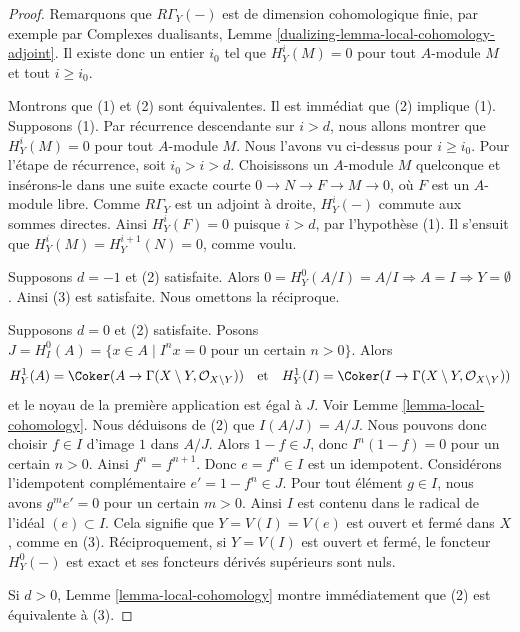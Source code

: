 \begin{proof}
Remarquons que $R\Gamma_Y(-)$ est de dimension cohomologique finie, par exemple par
Complexes dualisants, Lemme \ref{dualizing-lemma-local-cohomology-adjoint}.
Il existe donc un entier $i_0$ tel que
$H^i_Y(M) = 0$ pour tout $A$-module $M$ et tout $i \geq i_0$.

\medskip\noindent
Montrons que (1) et (2) sont équivalentes. Il est immédiat que
(2) implique (1). Supposons (1). Par récurrence descendante sur $i > d$,
nous allons montrer que $H^i_Y(M) = 0$ pour tout $A$-module $M$.
Nous l'avons vu ci-dessus pour $i \geq i_0$. Pour l'étape de récurrence,
soit $i_0 > i > d$. Choisissons un $A$-module $M$ quelconque et insérons-le dans
une suite exacte courte $0 \to N \to F \to M \to 0$, où $F$ est un
$A$-module libre. Comme $R\Gamma_Y$ est un adjoint à droite,
$H^i_Y(-)$ commute aux sommes directes. Ainsi $H^i_Y(F) = 0$
puisque $i > d$, par l'hypothèse (1). Il s'ensuit que
$H^i_Y(M) = H^{i + 1}_Y(N) = 0$, comme voulu.

\medskip\noindent
Supposons $d = -1$ et (2) satisfaite. Alors $0 = H^0_Y(A/I) = A/I \Rightarrow A = I
\Rightarrow Y = \emptyset$. Ainsi (3) est satisfaite. Nous omettons la réciproque.

\medskip\noindent
Supposons $d = 0$ et (2) satisfaite. Posons
$J = H^0_I(A) = \{x \in A \mid I^nx = 0 \text{ pour un certain }n > 0\}$.
Alors
$$
H^1_Y(A) = \Coker(A \to \Gamma(X \setminus Y, \mathcal{O}_{X \setminus Y}))
\quad\text{et}\quad
H^1_Y(I) = \Coker(I \to \Gamma(X \setminus Y, \mathcal{O}_{X \setminus Y}))
$$
et le noyau de la première application est égal à $J$. Voir
Lemme \ref{lemma-local-cohomology}.
Nous déduisons de (2) que $I(A/J) = A/J$.
Nous pouvons donc choisir $f \in I$
d'image $1$ dans $A/J$. Alors $1 - f \in J$, donc $I^n(1 - f) = 0$ pour un certain
$n > 0$. Ainsi $f^n = f^{n + 1}$. Donc $e = f^n \in I$ est un idempotent.
Considérons l'idempotent complémentaire $e' = 1 - f^n \in J$.
Pour tout élément $g \in I$, nous avons $g^m e' = 0$ pour un certain $m > 0$.
Ainsi $I$ est contenu dans le radical de l'idéal $(e) \subset I$.
Cela signifie que $Y = V(I) = V(e)$ est ouvert et fermé dans $X$, comme en (3).
Réciproquement, si $Y = V(I)$ est ouvert et fermé, le foncteur
$H^0_Y(-)$ est exact et ses foncteurs dérivés supérieurs sont nuls.

\medskip\noindent
Si $d > 0$, Lemme \ref{lemma-local-cohomology} montre immédiatement
que (2) est équivalente à (3).
\end{proof}

